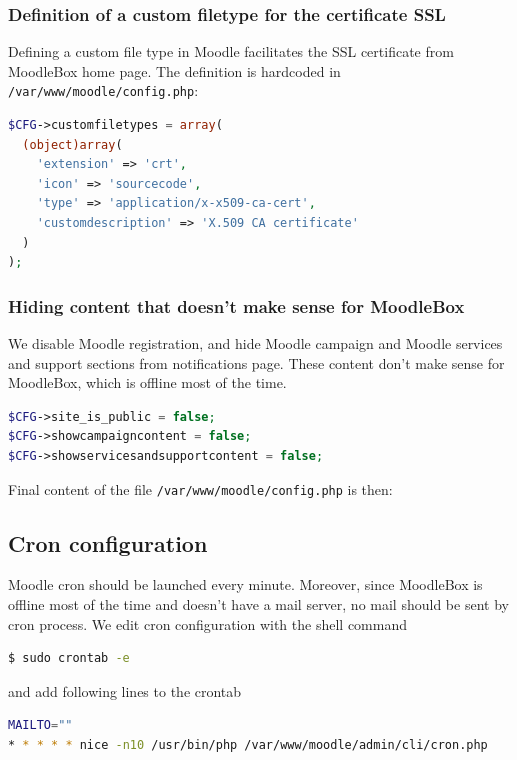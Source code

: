 \documentclass[12pt]{article}
\begin{document}
\subsubsection{Definition of a custom filetype for the certificate SSL}

Defining a custom file type in Moodle facilitates the SSL certificate from MoodleBox home page. The definition is hardcoded in \lstinline{/var/www/moodle/config.php}:
\begin{lstlisting}[language=php]
$CFG->customfiletypes = array(
  (object)array(
    'extension' => 'crt',
    'icon' => 'sourcecode',
    'type' => 'application/x-x509-ca-cert',
    'customdescription' => 'X.509 CA certificate'
  )
);
\end{lstlisting}

\subsubsection{Hiding content that doesn't make sense for MoodleBox}

We disable Moodle registration, and hide Moodle campaign and Moodle services and support sections from notifications page.
These content don't make sense for MoodleBox, which is offline most of the time.
\begin{lstlisting}[language=php]
$CFG->site_is_public = false;
$CFG->showcampaigncontent = false;
$CFG->showservicesandsupportcontent = false;
\end{lstlisting}

Final content of the file \lstinline{/var/www/moodle/config.php} is then:





\subsection{Cron configuration}

Moodle cron should be launched every minute.
Moreover, since MoodleBox is offline most of the time and doesn't have a mail server, no mail should be sent by cron process.
We edit cron configuration with the shell command
\begin{lstlisting}[language=bash]
$ sudo crontab -e
\end{lstlisting}
and add following lines to the crontab
\begin{lstlisting}[language=bash]
MAILTO=""
* * * * * nice -n10 /usr/bin/php /var/www/moodle/admin/cli/cron.php
\end{lstlisting}
\end{document}
